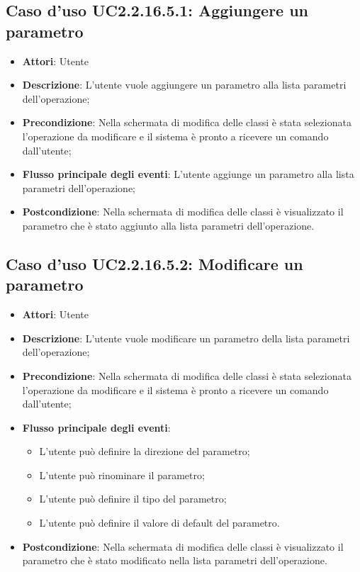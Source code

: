 \documentclass[../AnalisiDeiRequisiti.tex]{subfiles}
\begin{document}
			\subsection{Caso d'uso UC2.2.16.5.1: Aggiungere un parametro}
			\begin{itemize}
				\item \textbf{Attori}: Utente
				\item \textbf{Descrizione}: L'utente vuole aggiungere un parametro alla lista parametri dell'operazione;
				\item \textbf{Precondizione}: Nella schermata di modifica delle classi è stata selezionata l'operazione da modificare e il sistema è pronto a ricevere un comando dall'utente;
				\item \textbf{Flusso principale degli eventi}: L'utente aggiunge un parametro alla lista parametri dell'operazione;
				\item \textbf{Postcondizione}: Nella schermata di modifica delle classi è visualizzato il parametro che è stato aggiunto alla lista parametri dell'operazione.
			\end{itemize}
			\subsection{Caso d'uso UC2.2.16.5.2: Modificare un parametro}
			\begin{itemize}
				\item \textbf{Attori}: Utente
				\item \textbf{Descrizione}: L'utente vuole modificare un parametro della lista parametri dell'operazione;
				\item \textbf{Precondizione}: Nella schermata di modifica delle classi è stata selezionata l'operazione da modificare e il sistema è pronto a ricevere un comando dall'utente;
				\item \textbf{Flusso principale degli eventi}: \begin{itemize} \item L'utente può definire la direzione del parametro; \item L'utente può rinominare il parametro; \item L'utente può definire il tipo del parametro; \item L'utente può definire il valore di default del parametro. \end{itemize}
				\item \textbf{Postcondizione}: Nella schermata di modifica delle classi è visualizzato il parametro che è stato modificato nella lista parametri dell'operazione.
			\end{itemize}
\end{document}
